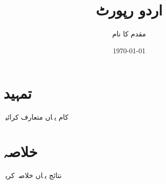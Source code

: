 \documentclass[12pt]{report}
\title{اردو رپورٹ}
\author{مقدم کا نام}
\date{\today}
\begin{document}
\maketitle
\tableofcontents

\chapter{تمہید}
کام یہاں متعارف کرائیںؔ

\chapter{خلاصہ}
نتائج یہاں خلاصہ کریںؔ

% 
\end{document}
